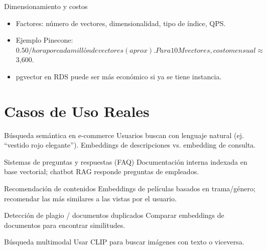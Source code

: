 \documentclass[aspectratio=169, 10pt, xcolor=table]{beamer}
\begin{document}
\begin{frame}{Dimensionamiento y costos}
    \begin{itemize}
        \item Factores: número de vectores, dimensionalidad, tipo de índice, QPS.
        \item Ejemplo Pinecone: $0.50/hora por cada millón de vectores (aprox). Para 10M vectores, costo mensual ≈ $3,600.
        \item pgvector en RDS puede ser más económico si ya se tiene instancia.
    \end{itemize}
\end{frame}

\section{Casos de Uso Reales}

\begin{frame}{Búsqueda semántica en e-commerce}
    Usuarios buscan con lenguaje natural (ej. ``vestido rojo elegante''). Embeddings de descripciones vs. embedding de consulta.
\end{frame}

\begin{frame}{Sistemas de preguntas y respuestas (FAQ)}
    Documentación interna indexada en base vectorial; chatbot RAG responde preguntas de empleados.
\end{frame}

\begin{frame}{Recomendación de contenidos}
    Embeddings de películas basados en trama/género; recomendar las más similares a las vistas por el usuario.
\end{frame}

\begin{frame}{Detección de plagio / documentos duplicados}
    Comparar embeddings de documentos para encontrar similitudes.
\end{frame}

\begin{frame}{Búsqueda multimodal}
    Usar CLIP para buscar imágenes con texto o viceversa.
\end{frame}

\end{document}
